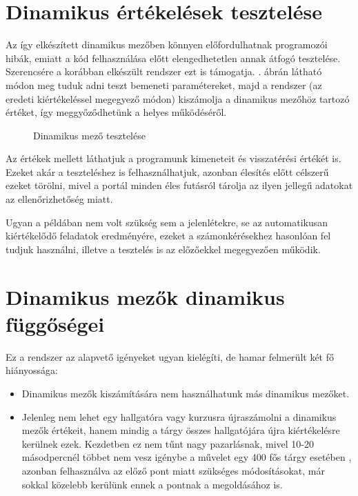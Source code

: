 \section{Dinamikus értékelések tesztelése}
Az így elkészített dinamikus mezőben könnyen előfordulhatnak programozói hibák, emiatt a kód felhasználása előtt elengedhetetlen annak átfogó tesztelése. Szerencsére a korábban elkészült rendszer ezt is támogatja. . ábrán látható módon meg tuduk adni teszt bemeneti paramétereket, majd a rendszer (az eredeti kiértékeléssel megegyező módon) kiszámolja a dinamikus mezőhöz tartozó értéket, így meggyőződhetünk a helyes működéséről.

\begin{figure}[h]
    \centering
    \caption{Dinamikus mező tesztelése}
    \label{fig:jporta_dynamic_test}
\end{figure}

Az értékek mellett láthatjuk a programunk kimeneteit és visszatérési értékét is. Ezeket akár a teszteléshez is felhasználhatjuk, azonban élesítés előtt célszerű ezeket törölni, mivel a portál minden éles futásról tárolja az ilyen jellegű adatokat az ellenőrizhetőség miatt.

Ugyan a példában nem volt szükség sem a jelenlétekre, se az automatikusan kiértékelődő feladatok eredményére, ezeket a számonkérésekhez hasonlóan fel tudjuk használni, illetve a tesztelés is az előzőekkel megegyezően működik.

\section{Dinamikus mezők dinamikus függőségei}\label{section:dynamic_dependencies}
Ez a rendszer az alapvető igényeket ugyan kielégíti, de hamar felmerült két fő hiányossága:

\begin{itemize}
    \item Dinamikus mezők kiszámítására nem használhatunk más dinamikus mezőket. 
    \item Jelenleg nem lehet egy hallgatóra vagy kurzusra újraszámolni a dinamikus mezők értékeit, hanem mindig a tárgy összes hallgatójára újra kiértékelésre kerülnek ezek. Kezdetben ez nem tűnt nagy pazarlásnak, mivel 10-20 másodpercnél többet nem vesz igénybe a művelet egy 400 fős tárgy esetében \cite{KalmanMsc}, azonban felhasználva az előző pont miatt szükséges módosításokat, már sokkal közelebb kerülünk ennek a pontnak a megoldásához is.
\end{itemize}

